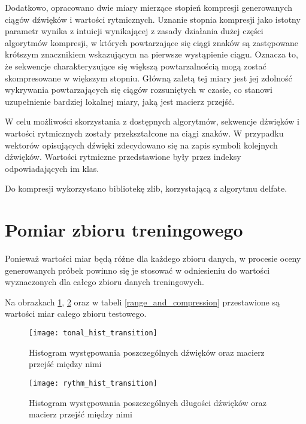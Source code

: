 {{        Dodatkowo, opracowano dwie miary mierzące stopień kompresji generowanych ciągów dźwięków i wartości rytmicznych. 
        Uznanie stopnia kompresji jako istotny parametr wynika z intuicji wynikającej z zasady działania dużej części
        algorytmów kompresji, w których powtarzające się ciągi znaków są zastępowane krótszym znacznikiem wskazującym na pierwsze 
        wystąpienie ciągu. 
        Oznacza to, że sekwencje charakteryzujące się większą powtarzalnością mogą zostać skompresowane w większym stopniu.
        Główną zaletą tej miary jest jej zdolność wykrywania powtarzających się ciągów rozsuniętych w czasie, co stanowi uzupełnienie 
        bardziej lokalnej miary, jaką jest macierz przejść.

        W celu możliwości skorzystania z dostępnych algorytmów, sekwencje dźwięków i wartości rytmicznych zostały przekształcone
        na ciągi znaków. W przypadku wektorów opisujących dźwięki zdecydowano się na zapis symboli kolejnych dźwięków. Wartości
        rytmiczne przedstawione były przez indeksy odpowiadających im klas. 

        Do kompresji wykorzystano bibliotekę zlib, korzystającą z algorytmu delfate.
    }

    \section{Pomiar zbioru treningowego}
    {
        Ponieważ wartości miar będą różne dla każdego zbioru danych, w procesie oceny generowanych próbek powinno się je 
        stosować w odniesieniu do wartości wyznaczonych dla całego zbioru danych treningowych.
        
        Na obrazkach \ref{tonal_hist_transition}, \ref{rythm_hist_transition} oraz w tabeli \ref{range_and_compression} 
        przestawione są wartości miar całego zbioru testowego.

        \begin{figure}
            \centering
            \texttt{[image: tonal\_hist\_transition]}
            \caption{Histogram występowania poszczególnych dźwięków oraz macierz przejść między nimi}
            \label{tonal_hist_transition}
        \end{figure}

        \begin{figure}
            \centering
            \texttt{[image: rythm\_hist\_transition]}
            \caption{Histogram występowania poszczególnych długości dźwięków oraz macierz przejść między nimi}
            \label{rythm_hist_transition}
        \end{figure}

}}
